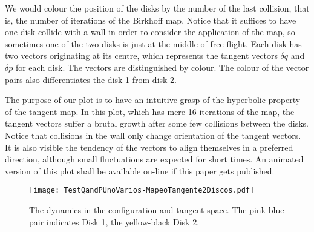 \documentclass[a4paper,10pt]{article}
\begin{document}
We would colour the position of the disks by the number of
the last collision, that is, the number of iterations of
the Birkhoff map. Notice that it suffices to have one disk collide
with a wall in order to consider the application of the map, so
sometimes one of the two disks is just at the middle of
free flight. Each disk has two vectors originating at its centre,
which represents the tangent vectors $\delta q$ and 
$\delta p$ for each disk. 
The vectors are distinguished by colour. The colour of the vector pairs
also differentiates the disk 1 from disk 2. 

The purpose of our plot is to have an intuitive grasp of the
hyperbolic property of the tangent map. In this plot, which has mere 16
iterations of the map, the tangent vectors suffer a brutal growth after
some few collisions between the disks. Notice that collisions in
the wall only change orientation of the tangent vectors.
It is also visible the tendency of the vectors to align themselves
in a preferred direction, although small fluctuations are
expected for short times. An animated version of this plot 
shall be available on-line if this paper gets published. 

\begin{figure}
\centering
\texttt{[image: TestQandPUnoVarios-MapeoTangente2Discos.pdf]} 
\caption{The dynamics in the configuration and tangent space. The pink-blue pair
indicates Disk 1, the yellow-black Disk 2.}\label{TangentMap}
\end{figure}




\end{document}

